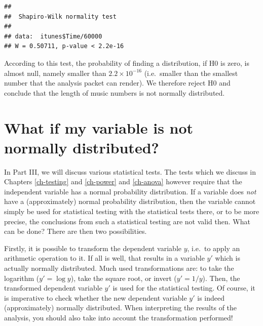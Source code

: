 \documentclass[
]{book}
\newenvironment{Shaded}{\begin{snugshade}}{\end{snugshade}}
\newcommand{\DecValTok}[1]{\textcolor[rgb]{0.00,0.00,0.81}{#1}}
\newcommand{\FunctionTok}[1]{\textcolor[rgb]{0.00,0.00,0.00}{#1}}
\newcommand{\NormalTok}[1]{#1}
\newcommand{\SpecialCharTok}[1]{\textcolor[rgb]{0.00,0.00,0.00}{#1}}
\begin{document}
\begin{Shaded}
\end{Shaded}

\begin{verbatim}
## 
##  Shapiro-Wilk normality test
## 
## data:  itunes$Time/60000
## W = 0.50711, p-value < 2.2e-16
\end{verbatim}

According to this test, the probability of finding a distribution, if H0 is
zero, is almost null, namely smaller than \(2.2 \times 10^{-16}\) (i.e.~smaller than
the smallest number that the analysis packet can render). We therefore
reject H0 and conclude that the length of music numbers is not normally
distributed.

\hypertarget{sec:whatifnotnormal}{%
\section{What if my variable is not normally distributed?}\label{sec:whatifnotnormal}}

In Part III, we will discuss various statistical tests.
The tests which we discuss in Chapters \ref{ch-testing} and \ref{ch-power} and
\ref{ch-anova} however require that the independent
variable has a normal probability distribution. If a variable does \emph{not} have
a (approximately) normal probability distribution, then the variable cannot
simply be used for statistical testing with the statistical tests
there, or to be more precise, the conclusions from such a statistical testing
are not valid then. What can be done? There are then two
possibilities.

Firstly, it is possible to transform the dependent variable \(y\),
i.e.~to apply an arithmetic operation to it. If all is well, that results
in a variable \(y'\) which is actually normally distributed. Much used transformations are: to take the logarithm (\(y'=\log{y}\)), take the square root, or
invert (\(y'=1/y\)). Then, the transformed dependent variable \(y'\) is used for
the statistical testing. Of course, it is imperative to check whether the
new dependent variable \(y'\) is indeed (approximately) normally distributed. When
interpreting the results of the analysis, you should also take into account
the transformation performed!
\end{document}
